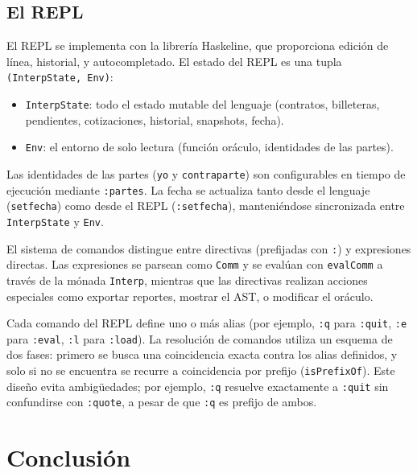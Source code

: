 \documentclass[a4paper, 12pt]{article}
\begin{document}
\subsection{El REPL}

El REPL se implementa con la librería Haskeline\cite{haskeline}, que proporciona edición de línea, historial, y autocompletado. El estado del REPL es una tupla \texttt{(InterpState, Env)}:

\begin{itemize}[nosep]
    \item \texttt{InterpState}: todo el estado mutable del lenguaje (contratos, billeteras, pendientes, cotizaciones, historial, snapshots, fecha).
    \item \texttt{Env}: el entorno de solo lectura (función oráculo, identidades de las partes).
\end{itemize}

Las identidades de las partes (\texttt{yo} y \texttt{contraparte}) son configurables en tiempo de ejecución mediante \texttt{:partes}. La fecha se actualiza tanto desde el lenguaje (\texttt{setfecha}) como desde el REPL (\texttt{:setfecha}), manteniéndose sincronizada entre \texttt{InterpState} y \texttt{Env}.

El sistema de comandos distingue entre directivas (prefijadas con \texttt{:}) y expresiones directas. Las expresiones se parsean como \texttt{Comm} y se evalúan con \texttt{evalComm} a través de la mónada \texttt{Interp}, mientras que las directivas realizan acciones especiales como exportar reportes, mostrar el AST, o modificar el oráculo.

Cada comando del REPL define uno o más alias (por ejemplo, \texttt{:q} para \texttt{:quit}, \texttt{:e} para \texttt{:eval}, \texttt{:l} para \texttt{:load}). La resolución de comandos utiliza un esquema de dos fases: primero se busca una coincidencia exacta contra los alias definidos, y solo si no se encuentra se recurre a coincidencia por prefijo (\texttt{isPrefixOf}). Este diseño evita ambigüedades; por ejemplo, \texttt{:q} resuelve exactamente a \texttt{:quit} sin confundirse con \texttt{:quote}, a pesar de que \texttt{:q} es prefijo de ambos.

\section{Conclusión}
\end{document}
